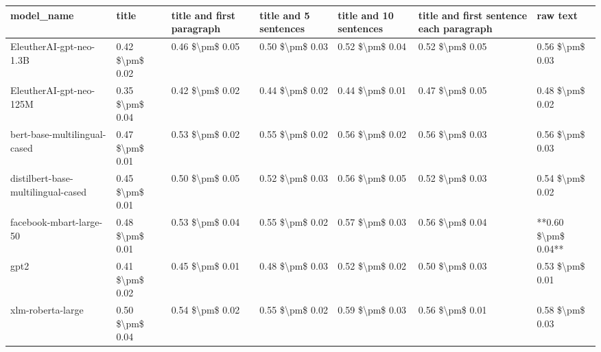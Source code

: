 \begin{tabular}{lllllll}
\toprule
                        model\_name &           title & title and first paragraph & title and 5 sentences & title and 10 sentences & title and first sentence each paragraph &            raw text \\
\midrule
           EleutherAI-gpt-neo-1.3B & 0.42 \$\textbackslash pm\$ 0.02 &           0.46 \$\textbackslash pm\$ 0.05 &       0.50 \$\textbackslash pm\$ 0.03 &        0.52 \$\textbackslash pm\$ 0.04 &                         0.52 \$\textbackslash pm\$ 0.05 &     0.56 \$\textbackslash pm\$ 0.03 \\
           EleutherAI-gpt-neo-125M & 0.35 \$\textbackslash pm\$ 0.04 &           0.42 \$\textbackslash pm\$ 0.02 &       0.44 \$\textbackslash pm\$ 0.02 &        0.44 \$\textbackslash pm\$ 0.01 &                         0.47 \$\textbackslash pm\$ 0.05 &     0.48 \$\textbackslash pm\$ 0.02 \\
      bert-base-multilingual-cased & 0.47 \$\textbackslash pm\$ 0.01 &           0.53 \$\textbackslash pm\$ 0.02 &       0.55 \$\textbackslash pm\$ 0.02 &        0.56 \$\textbackslash pm\$ 0.02 &                         0.56 \$\textbackslash pm\$ 0.03 &     0.56 \$\textbackslash pm\$ 0.03 \\
distilbert-base-multilingual-cased & 0.45 \$\textbackslash pm\$ 0.01 &           0.50 \$\textbackslash pm\$ 0.05 &       0.52 \$\textbackslash pm\$ 0.03 &        0.56 \$\textbackslash pm\$ 0.05 &                         0.52 \$\textbackslash pm\$ 0.03 &     0.54 \$\textbackslash pm\$ 0.02 \\
           facebook-mbart-large-50 & 0.48 \$\textbackslash pm\$ 0.01 &           0.53 \$\textbackslash pm\$ 0.04 &       0.55 \$\textbackslash pm\$ 0.02 &        0.57 \$\textbackslash pm\$ 0.03 &                         0.56 \$\textbackslash pm\$ 0.04 & **0.60 \$\textbackslash pm\$ 0.04** \\
                              gpt2 & 0.41 \$\textbackslash pm\$ 0.02 &           0.45 \$\textbackslash pm\$ 0.01 &       0.48 \$\textbackslash pm\$ 0.03 &        0.52 \$\textbackslash pm\$ 0.02 &                         0.50 \$\textbackslash pm\$ 0.03 &     0.53 \$\textbackslash pm\$ 0.01 \\
                 xlm-roberta-large & 0.50 \$\textbackslash pm\$ 0.04 &           0.54 \$\textbackslash pm\$ 0.02 &       0.55 \$\textbackslash pm\$ 0.02 &        0.59 \$\textbackslash pm\$ 0.03 &                         0.56 \$\textbackslash pm\$ 0.01 &     0.58 \$\textbackslash pm\$ 0.03 \\
\bottomrule
\end{tabular}
